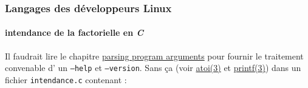 \documentclass[xcolor=svgnames,final,smaller,a4]{beamer}
\begin{document}
\begin{frame}
  \frametitle{Langages des développeurs Linux}
  \framesubtitle{intendance de la factorielle en \textit{C}}

Il faudrait lire le chapitre
\href{https://www.gnu.org/software/libc/manual/html_node/Parsing-Program-Arguments.html}{parsing
  program arguments} pour fournir le traitement convenable d' un
\texttt{--help} et \texttt{--version}. Sans ça (voir \href{https://man7.org/linux/man-pages/man3/atoi.3.html}{atoi(3)}
et \href{https://man7.org/linux/man-pages/man3/printf.3.html}{printf(3)}) dans
un fichier \texttt{intendance.c} contenant :

  
\end{frame}
\end{document}
